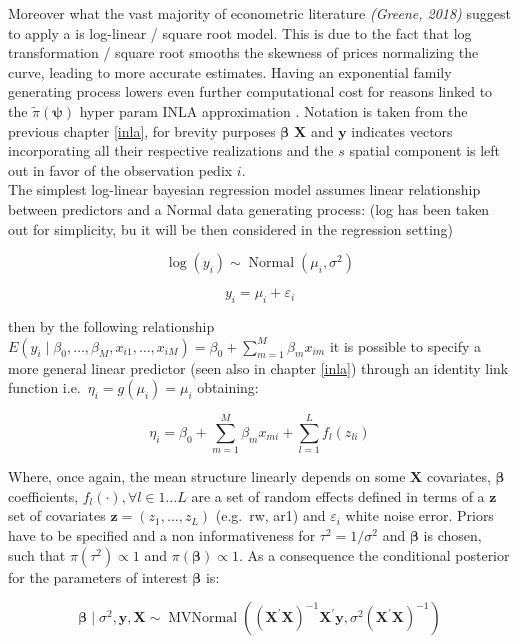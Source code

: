 \documentclass[
  12pt,
  a4paper,
  oneside]{book}
\begin{document}
Moreover what the vast majority of econometric literature \emph{(Greene, 2018)} suggest to apply a is log-linear / square root model. This is due to the fact that log transformation / square root smooths the skewness of prices normalizing the curve, leading to more accurate estimates. Having an exponential family generating process lowers even further computational cost for reasons linked to the \(\tilde\pi(\boldsymbol{\psi})\) hyper param INLA approximation \citep{Blangiardo-Cameletti}. Notation is taken from the previous chapter \ref{inla}, for brevity purposes \(\boldsymbol{\beta}\) \(\mathbf{X}\) and \(\boldsymbol{y}\) indicates vectors incorporating all their respective realizations and the \(s\) spatial component is left out in favor of the observation pedix \(i\).\\
The simplest log-linear bayesian regression model assumes linear relationship between predictors and a Normal data generating process: (log has been taken out for simplicity, bu it will be then considered in the regression setting)

\[
\log{(y_{i})} \sim \operatorname{Normal}(\mu_{i}, \sigma^{2})
\]

\[
y_{i}=\mu_{i}+\varepsilon_{i}
\]

then by the following relationship \(E\left(y_{i} \mid \beta_{0}, \ldots, \beta_{M}, x_{i 1}, \ldots, x_{i M}\right)=\beta_{0}+\sum_{m=1}^{M} \beta_{m} x_{i m}\) it is possible to specify a more general linear predictor (seen also in chapter \ref{inla}) through an identity link function i.e.~\(\eta_{i}=g\left(\mu_{i}\right)=\mu_{i}\) obtaining:

\[
\eta_{i}=\beta_{0}+\sum_{m=1}^{M} \beta_{m} x_{m i}+\sum_{l=1}^{L} f_{l}\left(z_{l i}\right)
\]

Where, once again, the mean structure linearly depends on some \(\mathbf{X}\) covariates, \(\boldsymbol{\beta}\) coefficients, \(f_{l}(\cdot), \forall l \in 1 \ldots L\) are a set of random effects defined in terms of a \(\boldsymbol{z}\) set of covariates \(\boldsymbol{z}=\left(z_{1}, \ldots, z_{L}\right)\) (e.g.~rw, ar1) and \(\varepsilon_{i}\) white noise error.
Priors have to be specified and a non informativeness for \(\tau^2 = 1/\sigma^2\) and \(\boldsymbol{\beta}\) is chosen, such that \(\pi(\tau^2) \propto 1\) and \(\pi(\boldsymbol\beta) \propto 1\). As a consequence the conditional posterior for the parameters of interest \(\boldsymbol{\beta}\) is:

\[
\boldsymbol{\beta} \mid \sigma^{2}, \boldsymbol{y}, \boldsymbol{X} \sim \operatorname{MVNormal}\left(\left(\boldsymbol{X}^{\prime} \boldsymbol{X}\right)^{-1} \boldsymbol{X}^{\prime} \boldsymbol{y}, \sigma^{2}\left(\boldsymbol{X}^{\prime} \boldsymbol{X}\right)^{-1}\right)
\]
\end{document}
